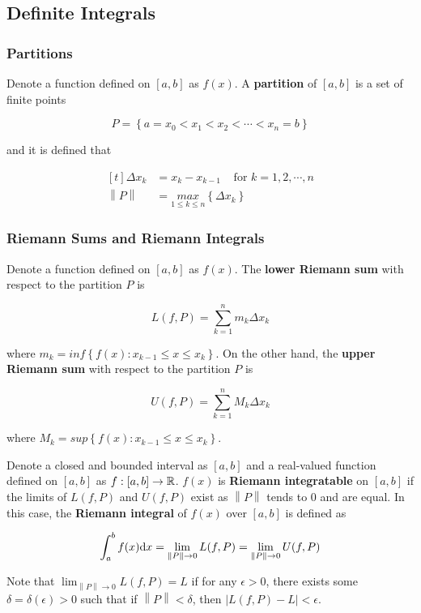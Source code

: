 \documentclass[a4paper,12pt]{article}
\begin{document}
\subsection{Definite Integrals}
\subsubsection{Partitions}
\begin{dft}
  Denote a function defined on $[a,b]$ as $f(x)$. A \textbf{partition} of $[a,b]$ is a set of finite points

  $$P=\left\{ a=x_{0}<x_{1}<x_{2}<\cdots<x_{n}=b\right\}$$

  and it is defined that

  $$\begin{aligned}[t]
    \Delta x_{k}&=x_{k}-x_{k-1}\;\;\;\;\text{for }k=1,2,\cdots,n\\
    \left\| P\right\| &=\underset{1\leq k\leq n}{max}\left\{ \Delta x_{k}\right\}
  \end{aligned}$$
\end{dft}

\subsubsection{Riemann Sums and Riemann Integrals}
\begin{dft}
  Denote a function defined on $[a,b]$ as $f(x)$. The \textbf{lower Riemann sum} with respect to the partition $P$ is

  $$L(f,P)=\sum_{k=1}^{n}m_{k}\Delta x_{k}$$\s

  where $m_{k}=inf\left\{ f(x):x_{k-1}\leq x\leq x_{k}\right\}$. On the other hand, the \textbf{upper Riemann sum} with respect to the partition $P$ is

  $$U(f,P)=\sum_{k=1}^{n}M_{k}\Delta x_{k}$$\s

  where $M_{k}=sup\left\{ f(x):x_{k-1}\leq x\leq x_{k}\right\}$.\n
\end{dft}

\begin{dft}
  Denote a closed and bounded interval as $[a,b]$ and a real-valued function defined on $[a,b]$ as $f: [a,b]\to\mathbb{R}$. $f(x)$ is \textbf{Riemann integratable} on $[a,b]$ if the limits of $L(f,P)$ and $U(f,P)$ exist as $\left\| P\right\|$ tends to $0$ and are equal. In this case, the \textbf{Riemann integral} of $f(x)$ over $[a,b]$ is defined as

  $$\int_{a}^{b}f(x)\mathrm{d} x=\lim_{\left\| P\right\| \to 0}L(f,P)=\lim_{\left\| P\right\| \to 0}U(f,P)$$\s

  Note that $\lim_{\left\| P\right\| \to 0}L(f,P)=L$ if for any $\epsilon>0$, there exists some $\delta=\delta(\epsilon)>0$ such that if $\left\| P\right\| <\delta$, then $\left| L(f,P)-L \right| <\epsilon$.
\end{dft}
\end{document}
